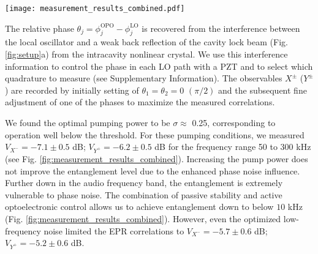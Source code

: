\documentclass[final,twocolumn,english,prl,notitlepage,nofootinbib,floatfix,longbibliography,superscriptaddress
]{revtex4-2}
\begin{document}
\begin{figure*}[ht]
\begin{center}
\texttt{[image: measurement\_results\_combined.pdf]} 
\caption{Spectra of the EPR quadratures normalized to shot-noise level (SN) for the frequency range 10 to 300 kHz. The left traces show the quantum noise suppression optimized for low spectral frequencies (10-50 kHz), while the right part corresponds to the best entanglement level achieved in 50-300 kHz spectral range (see text below). The narrow peaks come from the phase noise of the lasers. The data are corrected for electronic noise which is $18.5$ dB below the shot-noise level.}
\label{fig:measurement_results_combined}
\end{center}
\end{figure*}
The relative phase $\theta_j = \phi_j^{\text{OPO}}-\phi_j^{\text{LO}}$ is recovered from the interference between the local oscillator and a weak back reflection of the cavity lock beam (Fig. \ref{fig:setup}a) from the intracavity nonlinear crystal. We use this interference information to control the phase in each LO path with a PZT and to select which quadrature to measure (see Supplementary Information). The observables $X^{\pm}$ ($Y^{\pm}$) are recorded by initially setting of $\theta_1 = \theta_2 = 0 $ $(\pi/2)$ and the subsequent fine adjustment of one of the phases to maximize the measured correlations.\par
We found the optimal pumping power to be $\sigma\approx$ 0.25, corresponding to operation well below the threshold. For these pumping conditions, we measured $V_{X^-}=-7.1\pm0.5 $ dB; $V_{Y^+}=-6.2\pm0.5 $ dB for the frequency range 50 to 300 kHz (see Fig. \ref{fig:measurement_results_combined}). 
Increasing the pump power does not improve the entanglement level due to the enhanced phase noise influence. Further down in the audio frequency band, the entanglement is extremely vulnerable to phase noise. The combination of passive stability and active optoelectronic control allows us to achieve entanglement down to below $10$ kHz (Fig. \ref{fig:measurement_results_combined}). However, even the optimized low-frequency noise limited the EPR correlations to $V_{X^-}= -5.7\pm0.6$ dB;  $V_{Y^+}=-5.2\pm0.6$ dB. \par
\end{document}
